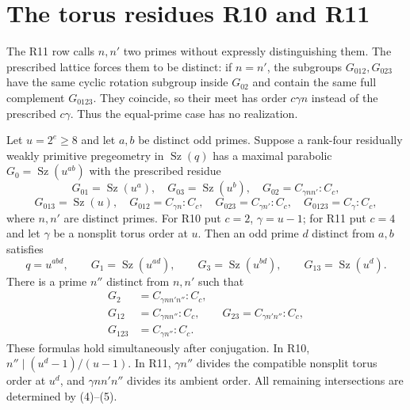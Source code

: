 \documentclass[11pt,a4paper]{article}
\newcommand{\Sz}{\operatorname{Sz}}\newcommand{\F}{\mathbb F}
\begin{document}
\section{The torus residues R10 and R11}
The R11 row calls $n,n'$ two primes without expressly distinguishing
them. The prescribed lattice forces them to be distinct: if $n=n'$,
the subgroups $G_{012},G_{023}$ have the same cyclic rotation subgroup
inside $G_{02}$ and contain the same full complement $G_{0123}$.
They coincide, so their meet has order $c\gamma n$ instead of the
prescribed $c\gamma$. Thus the equal-prime case has no realization.
\begin{theorem}\label{extensions}
Let $u=2^e\ge8$ and let $a,b$ be distinct odd primes. Suppose a
rank-four residually weakly primitive pregeometry in $\Sz(q)$ has
a maximal parabolic $G_0=\Sz(u^{ab})$ with the prescribed residue
\[
 G_{01}=\Sz(u^a),\quad G_{03}=\Sz(u^b),\quad
 G_{02}=C_{\gamma nn'}:C_c,
\]
\[
 G_{013}=\Sz(u),\quad G_{012}=C_{\gamma n}:C_c,
 \quad G_{023}=C_{\gamma n'}:C_c,
 \quad G_{0123}=C_\gamma:C_c,                  \tag{4}
\]
where $n,n'$ are distinct primes. For R10 put $c=2$, $\gamma=u-1$;
for R11 put $c=4$ and let $\gamma$ be a nonsplit torus order at $u$.
Then an odd prime $d$ distinct from $a,b$ satisfies
\[
 q=u^{abd},\qquad G_1=\Sz(u^{ad}),\qquad
 G_3=\Sz(u^{bd}),\qquad G_{13}=\Sz(u^d).
\]
There is a prime $n''$ distinct from $n,n'$ such that
\[
 \begin{split}
 G_2&=C_{\gamma nn'n''}:C_c,\\
 G_{12}&=C_{\gamma nn''}:C_c,\qquad
 G_{23}=C_{\gamma n'n''}:C_c,\\
 G_{123}&=C_{\gamma n''}:C_c.
 \end{split}                                \tag{5}
\]
These formulas hold simultaneously after conjugation. In R10,
$n''\mid(u^d-1)/(u-1)$. In R11, $\gamma n''$ divides the compatible
nonsplit torus order at $u^d$, and $\gamma nn'n''$ divides its
ambient order. All remaining intersections are determined by (4)--(5).
\end{theorem}
\end{document}
